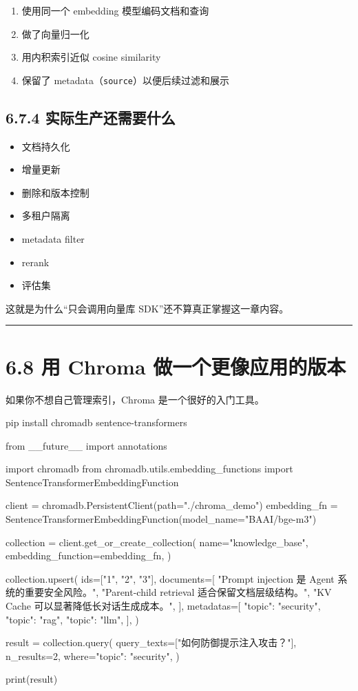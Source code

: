\begin{enumerate}[leftmargin=2em]
\item 使用同一个 embedding 模型编码文档和查询
\item 做了向量归一化
\item 用内积索引近似 cosine similarity
\item 保留了 metadata（\texttt{source}）以便后续过滤和展示
\end{enumerate}

\subsection{6.7.4 实际生产还需要什么}

\begin{itemize}[leftmargin=2em]
\item 文档持久化
\item 增量更新
\item 删除和版本控制
\item 多租户隔离
\item metadata filter
\item rerank
\item 评估集
\end{itemize}

这就是为什么``只会调用向量库 SDK''还不算真正掌握这一章内容。


\bigskip\hrule\bigskip

\section{6.8 用 Chroma 做一个更像应用的版本}

如果你不想自己管理索引，Chroma 是一个很好的入门工具。


\begin{codeblock}
pip install chromadb sentence-transformers
\end{codeblock}

\begin{codeblock}
from __future__ import annotations

import chromadb
from chromadb.utils.embedding_functions import SentenceTransformerEmbeddingFunction

client = chromadb.PersistentClient(path="./chroma_demo")
embedding_fn = SentenceTransformerEmbeddingFunction(model_name="BAAI/bge-m3")

collection = client.get_or_create_collection(
    name="knowledge_base",
    embedding_function=embedding_fn,
)

collection.upsert(
    ids=["1", "2", "3"],
    documents=[
        "Prompt injection 是 Agent 系统的重要安全风险。",
        "Parent-child retrieval 适合保留文档层级结构。",
        "KV Cache 可以显著降低长对话生成成本。",
    ],
    metadatas=[
        {"topic": "security"},
        {"topic": "rag"},
        {"topic": "llm"},
    ],
)

result = collection.query(
    query_texts=["如何防御提示注入攻击？"],
    n_results=2,
    where={"topic": "security"},
)

print(result)
\end{codeblock}

